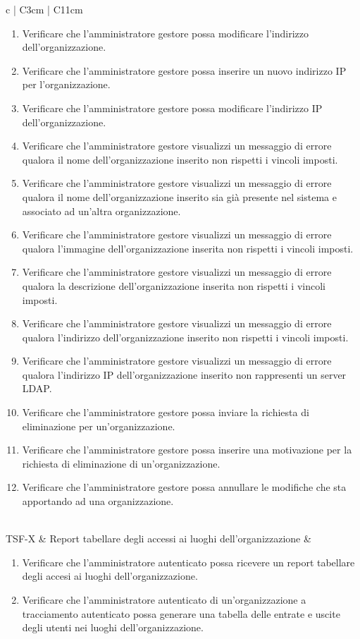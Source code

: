 {\begin{longtable}{ c | C{3cm} | C{11cm} }
\begin{enumerate}
\item Verificare che l'amministratore gestore possa modificare l'indirizzo dell’organizzazione.
\item Verificare che l'amministratore gestore possa inserire un nuovo indirizzo IP per l'organizzazione.
\item Verificare che l'amministratore gestore possa modificare l'indirizzo IP dell'organizzazione.
\item Verificare che l'amministratore gestore visualizzi un messaggio di errore qualora il nome dell'organizzazione inserito non rispetti i vincoli imposti.
\item Verificare che l'amministratore gestore visualizzi un messaggio di errore qualora il nome dell'organizzazione inserito sia già presente nel sistema e associato ad un'altra organizzazione.
\item Verificare che l'amministratore gestore visualizzi un messaggio di errore qualora l'immagine dell'organizzazione inserita non rispetti i vincoli imposti.
\item Verificare che l'amministratore gestore visualizzi un messaggio di errore qualora la descrizione dell'organizzazione inserita non rispetti i vincoli imposti.
\item Verificare che l'amministratore gestore visualizzi un messaggio di errore qualora l'indirizzo dell'organizzazione inserito non rispetti i vincoli imposti.
\item Verificare che l'amministratore gestore visualizzi un messaggio di errore qualora l'indirizzo IP dell'organizzazione inserito non rappresenti un server LDAP.
\item Verificare che l'amministratore gestore possa inviare la richiesta di eliminazione per un'organizzazione.
\item Verificare che l'amministratore gestore possa inserire una motivazione per la richiesta di eliminazione di un'organizzazione.
\item Verificare che l'amministratore gestore possa annullare le modifiche che sta apportando ad una organizzazione.
\end{enumerate} \\
TSF-X & Report tabellare degli accessi ai luoghi dell'organizzazione  & \begin{enumerate}
\item Verificare che l'amministratore autenticato possa ricevere un report tabellare degli accesi ai luoghi dell'organizzazione.
\item Verificare che l'amministratore autenticato di un'organizzazione a tracciamento autenticato possa generare una tabella delle entrate e uscite degli utenti nei luoghi dell'organizzazione.

\end{enumerate}
\end{longtable}}
